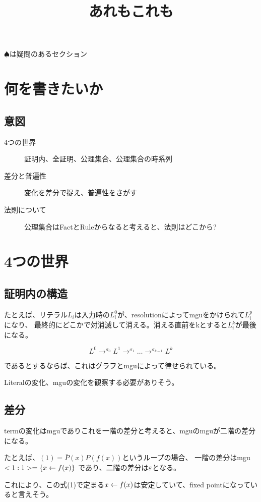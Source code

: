 \documentclass[10pt, oneside]{jarticle}   	%
\title{あれもこれも}
\author{\myname}
\begin{document}
\maketitle

\tableofcontents
$\spadesuit$は疑問のあるセクション
\newpage

\section{何を書きたいか}
\subsection{意図}
\begin{description}
\item[ 4つの世界] 証明内、全証明、公理集合、公理集合の時系列 
\item[ 差分と普遍性] 変化を差分で捉え、普遍性をさがす
\item[ 法則について] 公理集合はFactとRuleからなると考えると、法則はどこから?
\end{description}



\section{4つの世界}
\subsection{証明内の構造}
たとえば、リテラル$L_i$は入力時の$L^0_i$が、resolutionによってmguをかけられて$L^p_i$になり、
最終的にどこかで対消滅して消える。消える直前をkとすると$L^k_i$が最後になる。

$$L^0 \to^{\sigma_0} L^1 \to^{\sigma_1} \dots \to^{\sigma_{k-1}} L^k$$

であるとするならば、これはグラフとmguによって律せられている。

Literalの変化、mguの変化を観察する必要がありそう。

\subsection{差分}
termの変化はmguでありこれを一階の差分と考えると、mguのmguが二階の差分になる。

たとえば、$(1) = \bar{P}(x)P(f(x))$というループの場合、
一階の差分はmgu$<1:1> = \{x \leftarrow f(x)\}$
であり、二階の差分は$\varepsilon$となる。

これにより、この式(1)で定まる$x \leftarrow f(x)$は安定していて、fixed pointになっていると言えそう。
\end{document}
